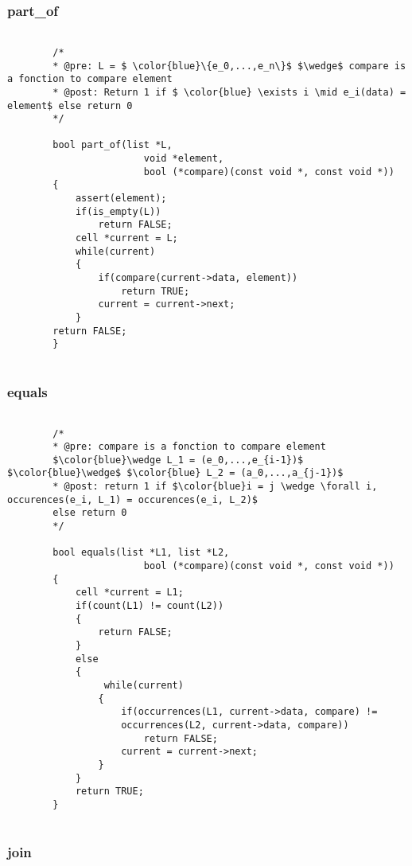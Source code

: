 \documentclass[a4paper, 11pt, oneside]{article}
\begin{document}
	\subsubsection{part\_of}
	
	\begin{lstlisting}[mathescape]
	
		/*
		* @pre: L = $ \color{blue}\{e_0,...,e_n\}$ $\wedge$ compare is a fonction to compare element
		* @post: Return 1 if $ \color{blue} \exists i \mid e_i(data) = element$ else return 0
		*/
		
		bool part_of(list *L, 
						void *element, 
						bool (*compare)(const void *, const void *))
		{
   			assert(element);
   			if(is_empty(L))
      			return FALSE;
   			cell *current = L;
   			while(current)
   			{
      			if(compare(current->data, element))
         			return TRUE;
      			current = current->next;
   			}
   		return FALSE;
		}
	
	\end{lstlisting}
	
	\subsubsection{equals}
	
	\begin{lstlisting}[mathescape]	
	
		/*
		* @pre: compare is a fonction to compare element  
		$\color{blue}\wedge L_1 = (e_0,...,e_{i-1})$ $\color{blue}\wedge$ $\color{blue} L_2 = (a_0,...,a_{j-1})$
		* @post: return 1 if $\color{blue}i = j \wedge \forall i, occurences(e_i, L_1) = occurences(e_i, L_2)$ 
		else return 0
		*/
		
		bool equals(list *L1, list *L2, 
						bool (*compare)(const void *, const void *))
		{
   			cell *current = L1;
   			if(count(L1) != count(L2))
   			{
      			return FALSE;
   			}
   			else
   			{
     			 while(current)
      			{
         			if(occurrences(L1, current->data, compare) != 
         			occurrences(L2, current->data, compare))
            			return FALSE;
         			current = current->next;
      			}
   			}
  			return TRUE;
		}
	
	\end{lstlisting}
	
	\subsubsection{join}
	
\end{document}
